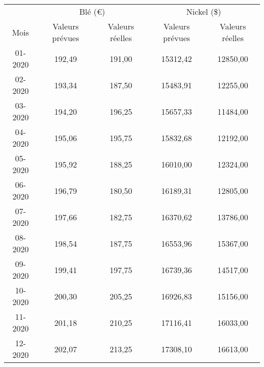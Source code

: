 \begin{tabular}{ccccc}
\toprule
      & \multicolumn{2}{c}{Blé (\euro)} & \multicolumn{2}{c}{Nickel (\$)} \\
Mois  & Valeurs prévues & Valeurs réelles & Valeurs prévues & Valeurs réelles \\
\cmidrule(r){1-1}\cmidrule(lr){2-3}\cmidrule(lr){4-5}
01-2020 & 192,49 & 191,00 & 15312,42 & 12850,00 \\
02-2020 & 193,34 & 187,50 & 15483,91 & 12255,00 \\
03-2020 & 194,20 & 196,25 & 15657,33 & 11484,00 \\
04-2020 & 195,06 & 195,75 & 15832,68 & 12192,00 \\
05-2020 & 195,92 & 188,25 & 16010,00 & 12324,00 \\
06-2020 & 196,79 & 180,50 & 16189,31 & 12805,00 \\
07-2020 & 197,66 & 182,75 & 16370,62 & 13786,00 \\
08-2020 & 198,54 & 187,75 & 16553,96 & 15367,00 \\
09-2020 & 199,41 & 197,75 & 16739,36 & 14517,00 \\
10-2020 & 200,30 & 205,25 & 16926,83 & 15156,00 \\
11-2020 & 201,18 & 210,25 & 17116,41 & 16033,00 \\
12-2020 & 202,07 & 213,25 & 17308,10 & 16613,00 \\
\bottomrule
\end{tabular}%
